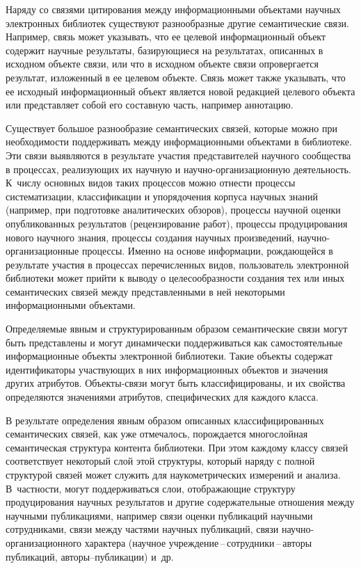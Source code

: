 \begin{multicols}{2}
     Наряду со связями цитирования между информационными объектами 
научных электронных биб\-лио\-тек существуют разнообразные другие 
семантические связи. Например, связь может указывать, что ее целевой 
информационный объект содержит научные результаты, базирующиеся на 
результатах, описанных в исходном объекте связи, или что в исходном объекте 
связи опровергается результат, изложенный в ее целевом объекте. Связь может 
также указывать, что ее исходный информационный объект является новой 
редакцией целевого объекта или представляет собой его составную часть, 
например аннотацию. 
     
     Существует большое разнообразие семантических связей, которые можно 
при необходимости поддерживать между информационными объектами в 
библиотеке. Эти связи выявляются в результате участия представителей 
научного сообщества в процессах, реализующих их научную и на\-уч\-но-ор\-га\-ни\-за\-ци\-он\-ную 
деятельность. К~чис\-лу основных видов таких процессов 
можно отнести процессы систематизации, классификации и упорядочения 
корпуса научных знаний (например, при подготовке аналитических обзоров), 
процессы научной оценки опубликованных результатов (рецензирование 
работ), процессы продуцирования нового научного знания, процессы создания 
научных произведений, на\-уч\-но-ор\-га\-ни\-за\-ци\-он\-ные процессы. Именно 
на основе информации, рождающейся в результате учас\-тия в процессах 
перечисленных видов, пользователь электронной библиотеки может прийти к 
выводу о целесообразности создания тех или иных семантических связей 
между представленными в ней некоторыми информационными объектами.
     
     Определяемые явным и структурированным образом семантические связи 
могут быть представлены и могут динамически поддерживаться как 
самостоятельные информационные объекты электронной библиотеки. Такие 
объекты содержат идентификаторы участвующих в них информационных 
объектов и значения других атрибутов. Объек\-ты-свя\-зи могут быть 
классифицированы, и их свойства определяются значениями атрибутов, 
специфических для каждого класса. 
     
     В результате определения явным образом описанных 
классифицированных семантических связей, как уже отмечалось, порождается 
многослойная семантическая структура контента библиотеки. При этом 
каждому классу связей соответствует некоторый слой этой структуры, который 
наряду с полной структурой связей может служить для наукометрических 
измерений и анализа. В~частности, могут поддерживаться слои, отображающие 
структуру продуцирования научных результатов и другие содержательные 
отношения между научными пуб\-ли\-ка\-ци\-ями, например связи оценки 
пуб\-ли\-ка\-ций научными сотрудниками, связи между час\-тя\-ми научных 
пуб\-ли\-ка\-ций, связи на\-уч\-но-ор\-га\-ни\-за\-ци\-он\-но\-го характера (научное 
     учреж\-де\-ние\,--\,со\-труд\-ни\-ки\,--\,ав\-то\-ры пуб\-ли\-ка\-ций, 
     ав\-то\-ры--пуб\-ли\-ка\-ции) и~др. 
     

\end{multicols}
